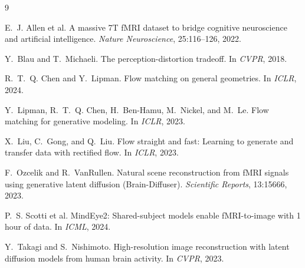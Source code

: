 \documentclass[11pt,a4paper]{article}
\theoremstyle{plain}
\theoremstyle{remark}
\begin{document}
\begin{thebibliography}{9}
\footnotesize

E.~J. Allen et al.
\newblock A massive 7T fMRI dataset to bridge cognitive neuroscience and
  artificial intelligence.
\newblock \emph{Nature Neuroscience}, 25:116--126, 2022.

Y.~Blau and T.~Michaeli.
\newblock The perception-distortion tradeoff.
\newblock In \emph{CVPR}, 2018.

R.~T.~Q. Chen and Y.~Lipman.
\newblock Flow matching on general geometries.
\newblock In \emph{ICLR}, 2024.

Y.~Lipman, R.~T.~Q. Chen, H.~Ben-Hamu, M.~Nickel, and M.~Le.
\newblock Flow matching for generative modeling.
\newblock In \emph{ICLR}, 2023.

X.~Liu, C.~Gong, and Q.~Liu.
\newblock Flow straight and fast: Learning to generate and transfer data with
  rectified flow.
\newblock In \emph{ICLR}, 2023.

F.~Ozcelik and R.~VanRullen.
\newblock Natural scene reconstruction from fMRI signals using generative
  latent diffusion (Brain-Diffuser).
\newblock \emph{Scientific Reports}, 13:15666, 2023.

P.~S. Scotti et al.
\newblock MindEye2: Shared-subject models enable fMRI-to-image with 1 hour of
  data.
\newblock In \emph{ICML}, 2024.

Y.~Takagi and S.~Nishimoto.
\newblock High-resolution image reconstruction with latent diffusion models
  from human brain activity.
\newblock In \emph{CVPR}, 2023.

\end{thebibliography}
\end{document}
